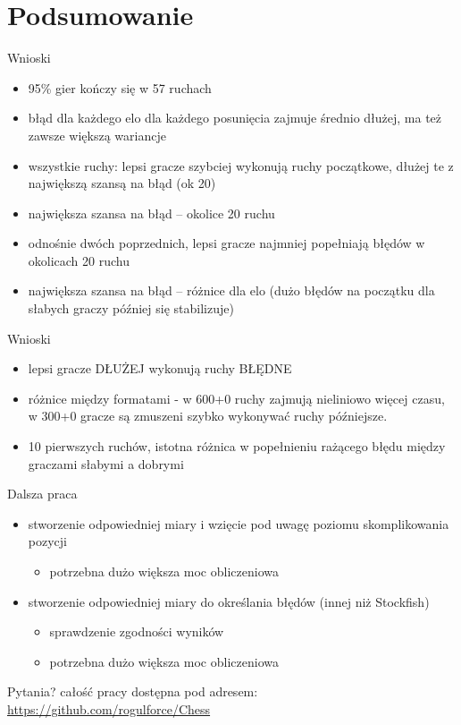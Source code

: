 \documentclass{beamer}
\begin{document}
\section{Podsumowanie}

\begin{frame}{Wnioski}
	\begin{itemize}
		\item 95\% gier kończy się w 57 ruchach
		\item błąd dla każdego elo dla każdego posunięcia zajmuje średnio dłużej, ma też zawsze większą wariancje
		\item wszystkie ruchy: lepsi gracze szybciej wykonują ruchy początkowe, dłużej te z największą szansą na błąd (ok 20)
		\item największa szansa na błąd -- okolice 20 ruchu
		\item odnośnie dwóch poprzednich, lepsi gracze najmniej popełniają błędów w okolicach 20 ruchu
		\item największa szansa na błąd -- różnice dla elo (dużo błędów na początku 
		dla słabych graczy później się stabilizuje)
	\end{itemize}
\end{frame}

\begin{frame}{Wnioski}
	\begin{itemize}
		\item lepsi gracze DŁUŻEJ wykonują ruchy BŁĘDNE
		\item różnice między formatami - w 600+0 ruchy zajmują nieliniowo więcej czasu, w 300+0 gracze są zmuszeni szybko wykonywać ruchy późniejsze.
		\item 10 pierwszych ruchów, istotna różnica w popełnieniu rażącego błędu między graczami słabymi a dobrymi
	\end{itemize}
\end{frame}


\begin{frame}{Dalsza praca}
	\begin{itemize}
		\item stworzenie odpowiedniej miary i wzięcie pod uwagę poziomu skomplikowania pozycji
		\begin{itemize}
			\item potrzebna dużo większa moc obliczeniowa	
		\end{itemize}
	
		\item stworzenie odpowiedniej miary do określania błędów (innej niż Stockfish)
		\begin{itemize}
			\item sprawdzenie zgodności wyników
			\item potrzebna dużo większa moc obliczeniowa	
		\end{itemize}
	\end{itemize}
	
\end{frame}

\begin{frame}{Pytania?}
	całość pracy dostępna pod adresem:\\ \url{https://github.com/rogulforce/Chess}
\end{frame}
\end{document}
